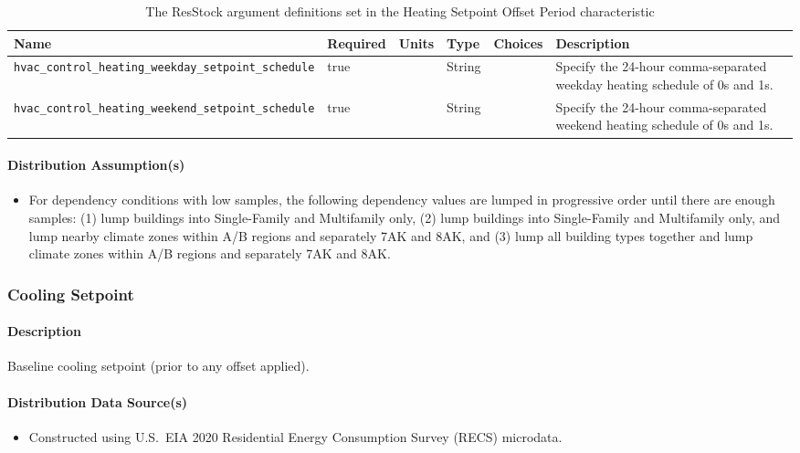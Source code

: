 \begin{longtable}[]{ |p{}|p{1.5cm}|p{1cm}|p{1.1cm}|p{1.4cm}|p{6cm}| }
\caption{The ResStock argument definitions set in the Heating Setpoint Offset Period characteristic} \label{table:hc_arg_def_ht_stp_per} \\
\toprule\noalign{}
Name & Required & Units & Type & Choices & Description \\
\midrule\noalign{}
\endhead
\bottomrule\noalign{}
\endlastfoot
\texttt{hvac\_control\_heating\_weekday\_setpoint\_schedule} & true & &
String & & Specify the 24-hour comma-separated weekday heating schedule
of 0s and 1s. \\
\hline
\texttt{hvac\_control\_heating\_weekend\_setpoint\_schedule} & true & &
String & & Specify the 24-hour comma-separated weekend heating schedule
of 0s and 1s. \\
\end{longtable}

\paragraph{Distribution Assumption(s)}
\begin{itemize}
    \item For dependency conditions with low samples, the following dependency values are lumped in progressive order until there are enough samples: (1) lump buildings into Single-Family and Multifamily only, (2) lump buildings into Single-Family and Multifamily only, and lump nearby climate zones within A/B regions and separately 7AK and 8AK, and (3) lump all building types together and lump climate zones within A/B regions and separately 7AK and 8AK.
\end{itemize}

\subsubsection{Cooling Setpoint}
\paragraph{Description}
Baseline cooling setpoint (prior to any offset applied).

\paragraph{Distribution Data Source(s)}
\begin{itemize}
    \item Constructed using U.S.~EIA 2020 Residential Energy Consumption Survey (RECS) microdata.
\end{itemize}

